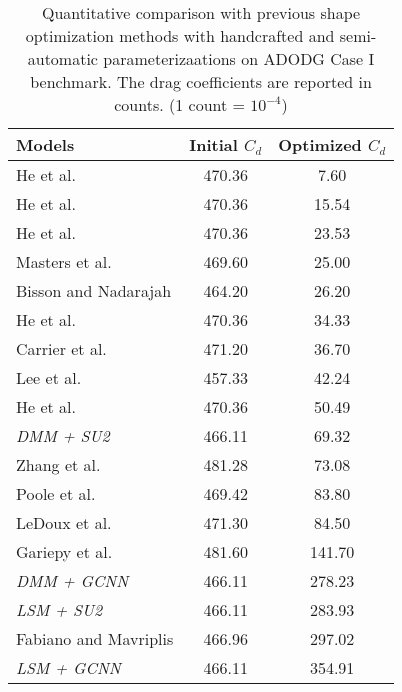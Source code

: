 \begin{table}[tbp]
  \centering
  \caption{Quantitative comparison with previous shape optimization methods with handcrafted and semi-automatic parameterizaations on ADODG Case I benchmark. The drag coefficients are reported in counts. (1 count = $10^{-4}$)}
    \begin{tabular}{l|c|c}
    \hline
    Models & Initial $C_d$ & Optimized $C_d$ \\
    \hline
    He et al. \cite{aa.He2019} & 470.36  & 7.60  \\
    He et al. \cite{aa.He2019} & 470.36  & 15.54  \\
    He et al. \cite{aa.He2019} & 470.36  & 23.53  \\
    Masters et al. \cite{aa.Masters2016} & 469.60  & 25.00  \\
    Bisson and Nadarajah \cite{aa.Bisson2015} & 464.20  & 26.20  \\
    He et al. \cite{aa.He2019} & 470.36  & 34.33  \\
    Carrier et al. \cite{aa.Carrier2014} & 471.20  & 36.70  \\
    Lee et al. \cite{aa.Lee2015} & 457.33  & 42.24  \\
    He et al. \cite{aa.He2019} & 470.36  & 50.49  \\
    \textit{DMM + SU2} & 466.11  & 69.32  \\
    Zhang et al. \cite{aa.Zhang2016} & 481.28  & 73.08  \\
    Poole et al. \cite{aa.Poole2015b} & 469.42  & 83.80  \\
    LeDoux et al. \cite{aa.LeDoux2015} & 471.30  & 84.50  \\
    Gariepy et al. \cite{aa.Gariepy2015} & 481.60  & 141.70  \\
    \textit{DMM + GCNN} & 466.11  & 278.23  \\
    \textit{LSM + SU2} & 466.11  & 283.93  \\
    Fabiano and Mavriplis \cite{aa.Fabiano2016} & 466.96  & 297.02  \\
    \textit{LSM + GCNN} & 466.11  & 354.91\\
    \hline
    \end{tabular}%
  \label{ch4:tab:result}%
\end{table}%